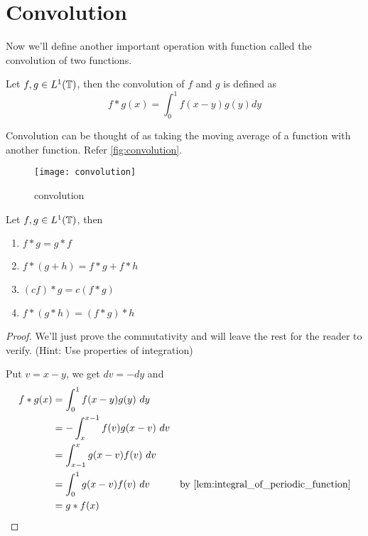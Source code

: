   \section{Convolution}
  Now we'll define another important operation with function called the convolution of two functions.
  \begin{definition}
    \label{def:convolution_of_functions_in_L^1(T)}
    Let $f, g \in L^1(\mathbb T)$, then the convolution of $f$ and $g$ is defined as 
    \begin{displaymath}
      f*g(x) = \int_0^1 f(x-y)g(y)dy
    \end{displaymath}
  \end{definition}

  Convolution can be thought of as taking the moving average of a function with another function. Refer \autoref{fig:convolution}.
  \begin{figure}
    \centering
    \texttt{[image: convolution]}
    \caption{convolution}
    \label{fig:convolution}
  \end{figure}

  \begin{proposition}
    \label{prop:properties_of_convolution}
    Let $f, g \in L^1(\mathbb T)$, then 
    \begin{enumerate}[label=(\alph*)]
      \item $f*g = g*f$
      \item $f*(g+h) = f*g +f*h$
      \item $(cf)*g = c(f*g)$
      \item $f*(g*h) = (f*g)*h$
    \end{enumerate}
  \end{proposition}
  \begin{proof}
    We'll just prove the commutativity and will leave the rest for the reader to verify. (Hint: Use properties of integration)

    Put $v = x-y$, we get $dv = -dy$ and 
    \begin{align*}
      f*g(x)  &= \int_{0}^{1}f(x-y)g(y) \ dy \\
              &= -\int_{x}^{x-1} f(v)g(x-v) \ dv\\
              &= \int_{x-1}^{x} g(x-v)f(v) \ dv \\
              &= \int_{0}^{1}g(x-v)f(v) \ dv  &\text{by \autoref{lem:integral_of_periodic_function}}\\
              &=g*f(x)
    \end{align*} 
  \end{proof}
  

